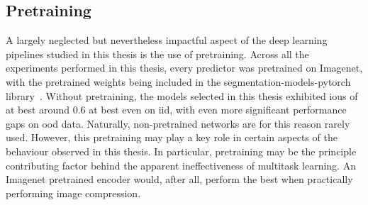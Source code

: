     \subsection{Pretraining} \label{pretraining}
        A largely neglected but nevertheless impactful aspect of the deep learning pipelines studied in this thesis is the use of pretraining. Across all the experiments performed in this thesis, every predictor was pretrained on Imagenet, with the pretrained weights being included in the segmentation-models-pytorch library~\cite{smp}. Without pretraining, the models selected in this thesis exhibited \glspl{iou} of at best around 0.6 at best even on \gls{iid}, with even more significant performance gaps on \gls{ood} data. Naturally, non-pretrained networks are for this reason rarely used. However, this pretraining may play a key role in certain aspects of the behaviour observed in this thesis. In particular, pretraining may be the principle contributing factor behind the apparent ineffectiveness of multitask learning. An Imagenet pretrained encoder would, after all, perform the best when practically performing image compression.